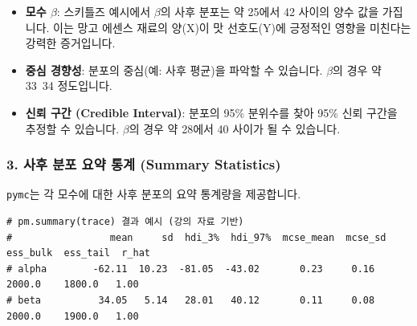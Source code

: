 \documentclass[11pt,a4paper]{book}
\theoremstyle{definition}
\begin{document}
\begin{infobox}[title=히스토그램 해석]
\begin{itemize}
    \item \textbf{모수 $\beta$}: 스키틀즈 예시에서 $\beta$의 사후 분포는 약 25에서 42 사이의 양수 값을 가집니다. 이는 망고 에센스 재료의 양(X)이 맛 선호도(Y)에 긍정적인 영향을 미친다는 강력한 증거입니다.
    \item \textbf{중심 경향성}: 분포의 중심(예: 사후 평균)을 파악할 수 있습니다. $\beta$의 경우 약 33~34 정도입니다.
    \item \textbf{신뢰 구간 (Credible Interval)}: 분포의 95\% 분위수를 찾아 95\% 신뢰 구간을 추정할 수 있습니다. $\beta$의 경우 약 28에서 40 사이가 될 수 있습니다.
\end{itemize}
\end{infobox}

\subsubsection*{3. 사후 분포 요약 통계 (Summary Statistics)}
\texttt{pymc}는 각 모수에 대한 사후 분포의 요약 통계량을 제공합니다.

\begin{lstlisting}[caption={\texttt{pymc} 사후 분포 요약 출력 예시}, label={lst:pymc_summary}]
# pm.summary(trace) 결과 예시 (강의 자료 기반)
#                 mean     sd  hdi_3%  hdi_97%  mcse_mean  mcse_sd  ess_bulk  ess_tail  r_hat
# alpha        -62.11  10.23  -81.05  -43.02       0.23     0.16    2000.0    1800.0   1.00
# beta          34.05   5.14   28.01   40.12       0.11     0.08    2000.0    1900.0   1.00
\end{lstlisting}
\end{document}
